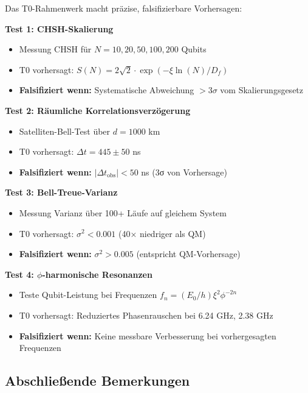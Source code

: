 Das T0-Rahmenwerk macht präzise, falsifizierbare Vorhersagen:

\begin{experimentbox}
	\textbf{Test 1: CHSH-Skalierung}
	\begin{itemize}
		\item Messung CHSH für $N = 10, 20, 50, 100, 200$ Qubits
		\item T0 vorhersagt: $S(N) = 2\sqrt{2} \cdot \exp(-\xi \ln(N)/D_f)$
		\item \textbf{Falsifiziert wenn:} Systematische Abweichung $> 3\sigma$ vom Skalierungsgesetz
	\end{itemize}
	
	\textbf{Test 2: Räumliche Korrelationsverzögerung}
	\begin{itemize}
		\item Satelliten-Bell-Test über $d = 1000$ km
		\item T0 vorhersagt: $\Delta t = 445 \pm 50$ ns
		\item \textbf{Falsifiziert wenn:} $|\Delta t_{\text{obs}}| < 50$ ns (3σ von Vorhersage)
	\end{itemize}
	
	\textbf{Test 3: Bell-Treue-Varianz}
	\begin{itemize}
		\item Messung Varianz über 100+ Läufe auf gleichem System
		\item T0 vorhersagt: $\sigma^2 < 0.001$ (40× niedriger als QM)
		\item \textbf{Falsifiziert wenn:} $\sigma^2 > 0.005$ (entspricht QM-Vorhersage)
	\end{itemize}
	
	\textbf{Test 4: $\phi$-harmonische Resonanzen}
	\begin{itemize}
		\item Teste Qubit-Leistung bei Frequenzen $f_n = (E_0/h) \xi^2 \phi^{-2n}$
		\item T0 vorhersagt: Reduziertes Phasenrauschen bei 6.24 GHz, 2.38 GHz
		\item \textbf{Falsifiziert wenn:} Keine messbare Verbesserung bei vorhergesagten Frequenzen
	\end{itemize}
\end{experimentbox}

\subsection{Abschließende Bemerkungen}

